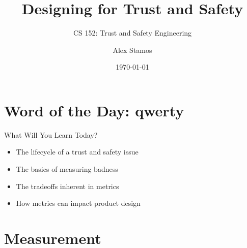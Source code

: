 \documentclass[nobackground,dvipsnames,table]{beamer}
\title{Designing for Trust and Safety}
\subtitle{CS 152: Trust and Safety Engineering}
\author[A. Stamos]{Alex Stamos}
\institute[Stanford University]{Stanford Cyber Policy Center}
\date[2022]{\today}
\begin{document}
\coverpage

\begin{frame}
    \titlepage
\end{frame}

\section{Word of the Day: qwerty}

\begin{frame}{What Will You Learn Today?}
    \begin{itemize}
        \item The lifecycle of a trust and safety issue
        \item The basics of measuring badness
        \item The tradeoffs inherent in metrics
        \item How metrics can impact product design
    \end{itemize}
\end{frame}

\section{Measurement}
\end{document}
